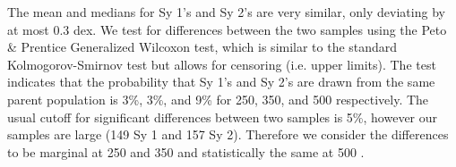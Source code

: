 The mean and medians for Sy 1's and Sy 2's are very similar, only deviating by at most 0.3 dex. We test for differences between the two samples using the Peto \& Prentice Generalized Wilcoxon test, which is similar to the standard Kolmogorov-Smirnov test but allows for censoring (i.e. upper limits). The test indicates that the probability that Sy 1's and Sy 2's are drawn from the same parent population is 3\%, 3\%, and 9\% for 250, 350, and 500 \um{} respectively. The usual cutoff for significant differences between two samples is 5\%, however our samples are large (149 Sy 1 and 157 Sy 2). Therefore we consider the differences to be marginal at 250 and 350 \um{} and statistically the same at 500 \um.